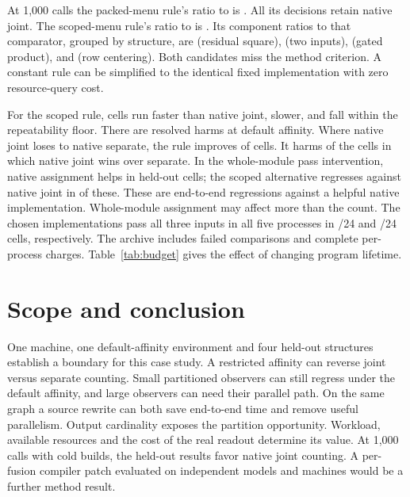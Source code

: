\documentclass[sigplan,10pt,review,anonymous,nonacm]{acmart}
\begin{document}
At 1,000 calls the packed-menu rule's ratio to \PackedBest{} is \PackedRatio{}. All its decisions retain native joint. The scoped-menu rule's ratio to \ScopedBest{} is \ScopedRatio{}. Its component ratios to that comparator, grouped by structure, are \ScopedResidual{} (residual square), \ScopedDual{} (two inputs), \ScopedGated{} (gated product), and \ScopedCenter{} (row centering). Both candidates miss the method criterion. A constant rule can be simplified to the identical fixed implementation with zero resource-query cost.

For the scoped rule, \ScopedFaster{} cells run faster than native joint, \ScopedSlower{} slower, and \ScopedTie{} fall within the repeatability floor. There are \ScopedHarm{} resolved harms at default affinity. Where native joint loses to native separate, the rule improves \ScopedRecovered{} of \ScopedRegress{} cells. It harms \ScopedLost{} of the \ScopedWins{} cells in which native joint wins over separate. In the whole-module pass intervention, native assignment helps in \ScopedPar{} held-out cells; the scoped alternative regresses against native joint in \ScopedParLost{} of these. These are end-to-end regressions against a helpful native implementation. Whole-module assignment may affect more than the count. The chosen implementations pass all three inputs in all five processes in \PackedValid{}/24 and \ScopedValid{}/24 cells, respectively. The archive includes failed comparisons and complete per-process charges. Table~\ref{tab:budget} gives the effect of changing program lifetime.



\section{Scope and conclusion}
One machine, one default-affinity environment and four held-out structures establish a boundary for this case study. A restricted affinity can reverse joint versus separate counting. Small partitioned observers can still regress under the default affinity, and large observers can need their parallel path. On the same graph a source rewrite can both save end-to-end time and remove useful parallelism. Output cardinality exposes the partition opportunity. Workload, available resources and the cost of the real readout determine its value. At 1,000 calls with cold builds, the held-out results favor native joint counting. A per-fusion compiler patch evaluated on independent models and machines would be a further method result.
\end{document}
